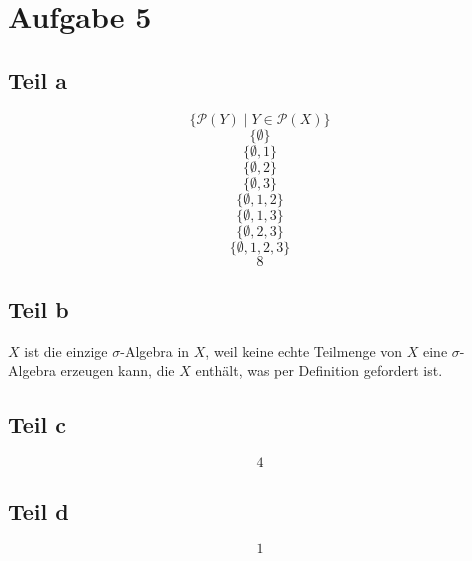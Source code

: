 \documentclass[10pt,a4paper]{article}
\begin{document}
\section{Aufgabe 5}

\subsection{Teil a}
\begin{equation}
  \{ \mathscr{P}(Y) \mid Y \in \mathscr{P}(X) \}
\end{equation}
\begin{equation}
  \{ \emptyset \}
\end{equation}
\begin{equation}
  \{ \emptyset, 1 \}
\end{equation}
\begin{equation}
  \{ \emptyset, 2 \}
\end{equation}
\begin{equation}
  \{ \emptyset, 3 \}
\end{equation}
\begin{equation}
  \{ \emptyset, 1, 2 \}
\end{equation}
\begin{equation}
  \{ \emptyset, 1, 3 \}
\end{equation}
\begin{equation}
  \{ \emptyset, 2, 3 \}
\end{equation}
\begin{equation}
  \{ \emptyset, 1, 2, 3 \}
\end{equation}
\begin{equation}
  8
\end{equation}

\subsection{Teil b}
$X$ ist die einzige $\sigma$-Algebra in $X$, weil keine echte Teilmenge von $X$ eine $\sigma$-Algebra erzeugen kann, die $X$ enthält, was per Definition gefordert ist.

\subsection{Teil c}
\begin{equation}
  4
\end{equation}

\subsection{Teil d}
\begin{equation}
  1
\end{equation}
\end{document}
